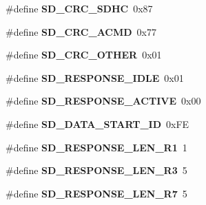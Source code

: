 \begin{DoxyCompactItemize}
\item 
\hypertarget{group__sd__private_gaebfe39966d1b7cb8895a3823bf37b687}{\#define {\bfseries \-S\-D\-\_\-\-C\-R\-C\-\_\-\-S\-D\-H\-C}~0x87}\label{group__sd__private_gaebfe39966d1b7cb8895a3823bf37b687}

\item 
\hypertarget{group__sd__private_ga66a6cb1d2cc6259eda998b1ed87c32fe}{\#define {\bfseries \-S\-D\-\_\-\-C\-R\-C\-\_\-\-A\-C\-M\-D}~0x77}\label{group__sd__private_ga66a6cb1d2cc6259eda998b1ed87c32fe}

\item 
\hypertarget{group__sd__private_ga1b1d92611a026ee8adf77c7f64345684}{\#define {\bfseries \-S\-D\-\_\-\-C\-R\-C\-\_\-\-O\-T\-H\-E\-R}~0x01}\label{group__sd__private_ga1b1d92611a026ee8adf77c7f64345684}

\item 
\hypertarget{group__sd__private_gaee4d451afbc1958199c95124726e976f}{\#define {\bfseries \-S\-D\-\_\-\-R\-E\-S\-P\-O\-N\-S\-E\-\_\-\-I\-D\-L\-E}~0x01}\label{group__sd__private_gaee4d451afbc1958199c95124726e976f}

\item 
\hypertarget{group__sd__private_ga69e982b3cb70e6aabb286662edcbc538}{\#define {\bfseries \-S\-D\-\_\-\-R\-E\-S\-P\-O\-N\-S\-E\-\_\-\-A\-C\-T\-I\-V\-E}~0x00}\label{group__sd__private_ga69e982b3cb70e6aabb286662edcbc538}

\item 
\hypertarget{group__sd__private_gad1b4bcef3c7415ee5fe917a69227504b}{\#define {\bfseries \-S\-D\-\_\-\-D\-A\-T\-A\-\_\-\-S\-T\-A\-R\-T\-\_\-\-I\-D}~0x\-F\-E}\label{group__sd__private_gad1b4bcef3c7415ee5fe917a69227504b}

\item 
\hypertarget{group__sd__private_ga9f5c2aa145c5ef12188d8be4b66f5b6e}{\#define {\bfseries \-S\-D\-\_\-\-R\-E\-S\-P\-O\-N\-S\-E\-\_\-\-L\-E\-N\-\_\-\-R1}~1}\label{group__sd__private_ga9f5c2aa145c5ef12188d8be4b66f5b6e}

\item 
\hypertarget{group__sd__private_ga739d053d99da71fcdf38da215cacb7a8}{\#define {\bfseries \-S\-D\-\_\-\-R\-E\-S\-P\-O\-N\-S\-E\-\_\-\-L\-E\-N\-\_\-\-R3}~5}\label{group__sd__private_ga739d053d99da71fcdf38da215cacb7a8}

\item 
\hypertarget{group__sd__private_ga0ffca3aee85a161a6d1b96a2b87e25fe}{\#define {\bfseries \-S\-D\-\_\-\-R\-E\-S\-P\-O\-N\-S\-E\-\_\-\-L\-E\-N\-\_\-\-R7}~5}\label{group__sd__private_ga0ffca3aee85a161a6d1b96a2b87e25fe}


\end{DoxyCompactItemize}

